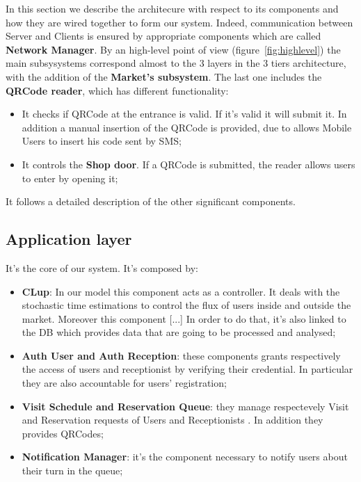 In this section we describe the architecure with respect to its components and how they are wired together to form our system. 
Indeed, communication between Server and Clients is ensured by appropriate components which are called \textbf{Network Manager}. 
By an high-level point of view (figure~\ref{fig:highlevel}) the main subsysystems correspond almost to the 3 layers in the 3 tiers architecture, with the addition of the \textbf{Market's subsystem}. The last one includes the \textbf{QRCode reader}, which has different functionality:
\begin{itemize}
\item It checks if QRCode at the entrance is valid. If it's valid it will submit it. In addition a manual insertion of the QRCode is provided, due to allows Mobile Users to insert his code sent by SMS;
\item It controls the \textbf{Shop door}. If a QRCode is submitted, the reader allows users to enter by opening it;
\end{itemize}

It follows a detailed description of the other significant components.

\subsection{Application layer}
It's the core of our system. It's composed by:
\begin{itemize}
\item \textbf{CLup}: In our model this component acts as a controller. It deals with the stochastic time estimations to control the flux of users inside and outside the market. Moreover this component [...] 
In order to do that, it's also linked to the DB which provides data that are going to be processed and analysed;
\item \textbf{Auth User and Auth Reception}: these components grants respectively the access of users and receptionist by verifying their credential. In particular they are also accountable for users' registration;
\item \textbf{Visit Schedule and Reservation Queue}: they manage respectevely Visit and Reservation requests of Users and Receptionists . In addition they provides QRCodes;
\item \textbf{Notification Manager}: it's the component necessary to notify users about their turn in the queue;
\end{itemize}


